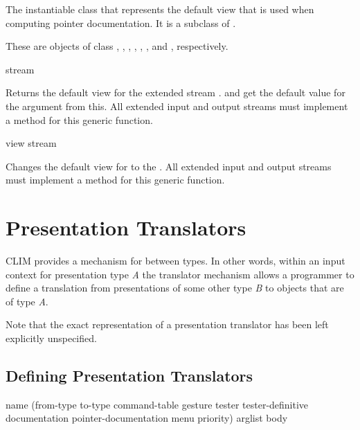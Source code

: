 
The instantiable class that represents the default view that is used when
computing pointer documentation.  It is a subclass of .


These are objects of class , ,
, , ,
, and , respectively.

 {stream}

Returns the default view for the extended stream .   and
 get the default value for the  argument from this.  All
extended input and output streams must implement a method for this generic
function.

 {view stream}

Changes the default view for  to the  .  All
extended input and output streams must implement a method for this generic
function.


\section {Presentation Translators}

CLIM provides a mechanism for  between types.  In other
words, within an input context for presentation type {\it A} the translator
mechanism allows a programmer to define a translation from presentations of some
other type {\it B} to objects that are of type {\it A}.

Note that the exact representation of a presentation translator has been left
explicitly unspecified.


\subsection {Defining Presentation Translators}

 {name 
                                            (from-type to-type command-table
                                             \key gesture
                                                  tester tester-definitive
                                                  documentation pointer-documentation 
                                                  menu priority)
                                            arglist
                                            \body body}

